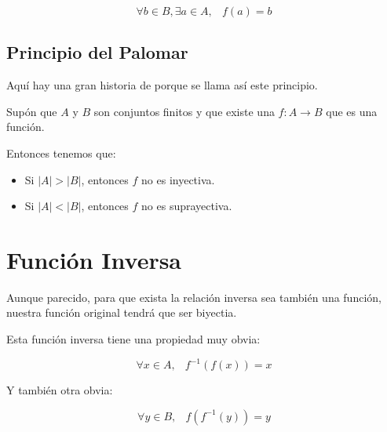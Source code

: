 \documentclass[12pt]{report}                                    %
\DeclareMathOperator \Space {\quad}                             %
\DeclareMathOperator \MiniSpace {\;}                            %
\begin{document}
                \begin{equation}
                    \forall b \in B, \exists a \in A, \MiniSpace f(a) = b
                \end{equation}


            \clearpage
            \subsection{Principio del Palomar}

                Aquí hay una gran historia de porque se llama así este principio.

                Supón que $A$ y $B$ son conjuntos finitos y que existe una $f: A \to B$ que es una función.

                Entonces tenemos que:
                \begin{itemize}
                    \item Si $|A| > |B|$, entonces $f$ no es inyectiva.
                    \item Si $|A| < |B|$, entonces $f$ no es suprayectiva.
                \end{itemize}







        \clearpage
        \section{Función Inversa}

            Aunque parecido, para que exista la relación inversa sea también una función, nuestra función original 
            tendrá que ser biyectia.

            Esta función inversa tiene una propiedad muy obvia:

            \begin{equation}
                \forall x \in A, \MiniSpace f^{-1}(f(x)) = x
            \end{equation}

            Y también otra obvia:

            \begin{equation}
                \forall y \in B, \MiniSpace f(f^{-1}(y)) = y
            \end{equation}
\end{document}
